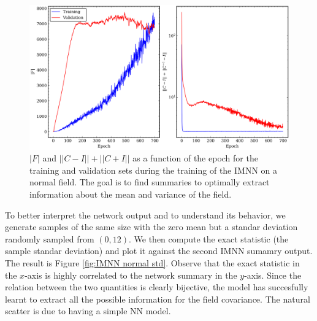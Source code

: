 \begin{figure}
    \centering
    \includegraphics[width=0.95\linewidth]{img/ML/normal_plot_training.png}
    \caption{$|F|$ and $||C-I ||+||C+I||$ as a function of the epoch for the training and validation sets during the training of the IMNN on a normal field. The goal is to find summaries to optimally extract information about the mean and variance of the field.}
    \label{fig:IMNN training normal test}
\end{figure}

To better interpret the network output and to understand its behavior, we generate samples of the same size with the zero mean but a standar deviation randomly sampled from $(0,12)$. We then compute the exact statistic (the sample standar deviation) and plot it against the second IMNN sumamry output. The result is Figure \ref{fig:IMNN normal std}. Observe that the exact statistic in the $x$-axis is highly correlated to the network summary in the $y$-axis. Since the relation between the two quantities is clearly bijective, the model has succesfully learnt to extract all the possible information for the field covariance. The natural scatter is due to having a simple NN model.

